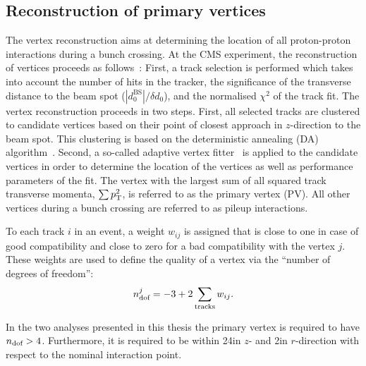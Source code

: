\subsection{Reconstruction of primary vertices} 
\label{sec:VertexReconstruction}
The vertex reconstruction aims at determining the location of all proton-proton interactions during a bunch crossing. 
At the CMS experiment, the reconstruction of vertices proceeds as follows~\cite{bib:CMS:tracking_8TeV}:
First, a track selection is performed which takes into account the number of hits in the tracker, the significance of the transverse distance to the beam spot ($|d_0^{\text{BS}}|/\delta d_0$), and the normalised $\chi^2$ of the track fit.
The vertex reconstruction proceeds in two steps.
First, all selected tracks are clustered to candidate vertices based on their point of closest approach in $z$-direction to the beam spot.
This clustering is based on the deterministic annealing (DA) algorithm~\cite{bib:VertexReconstruction_DA}.
Second, a so-called adaptive vertex fitter~\cite{bib:VertexReconstruction_AVF} is applied to the candidate vertices in order to determine the location of the vertices as well as performance parameters of the fit.
The vertex with the largest sum of all squared track transverse momenta, $\sum p_{\text{T}}^2$, is referred to as the primary vertex (PV). 
All other vertices during a bunch crossing are referred to as pileup interactions.

To each track $i$ in an event, a weight $w_{ij}$ is assigned that is close to one in case of good compatibility and close to zero for a bad compatibility with the vertex $j$.
These weights are used to define the quality of a vertex via the ``number of degrees of freedom'': 
\begin{equation}
n_{\text{dof}}^j = -3 + 2 \sum_{\text{tracks}} w_{ij}.
\end{equation}

In the two analyses presented in this thesis the primary vertex is required to have $n_{\text{dof}}>4$.
Furthermore, it is required to be within 24\cm in $z$- and 2\cm in $r$-direction with respect to the nominal interaction point.


